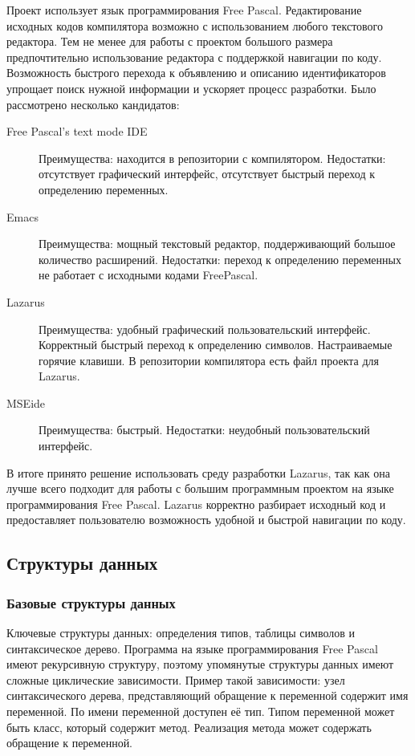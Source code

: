 \documentclass{imcs}
\begin{document}
Проект использует язык программирования Free Pascal. Редактирование исходных кодов
компилятора возможно с использованием любого текстового редактора. Тем не менее
для работы с проектом большого размера предпочтительно использование редактора с
поддержкой навигации по коду. Возможность быстрого перехода к объявлению и описанию
идентификаторов упрощает поиск нужной информации и ускоряет процесс разработки.
Было рассмотрено несколько кандидатов:
\begin{description}
  \item[Free Pascal's text mode IDE] Преимущества: находится в репозитории с 
компилятором. Недостатки: отсутствует графический интерфейс, отсутствует
быстрый переход к определению переменных.
  \item[Emacs] Преимущества: мощный текстовый редактор, поддерживающий большое
количество расширений. Недостатки: переход к определению переменных не работает
с исходными кодами FreePascal.
  \item[Lazarus] Преимущества: удобный графический пользовательский интерфейс.
Корректный быстрый переход к определению символов. Настраиваемые горячие клавиши.
В репозитории компилятора есть файл проекта для Lazarus.
  \item[MSEide] Преимущества: быстрый. Недостатки: неудобный 
пользовательский интерфейс.
\end{description} 
В итоге принято решение использовать среду разработки Lazarus, так как она
лучше всего подходит для работы с большим программным проектом на
языке программирования Free Pascal. Lazarus корректно разбирает
исходный код и предоставляет пользователю возможность удобной и
быстрой навигации по коду.

\fi

\subsection{Структуры данных}

\subsubsection{Базовые структуры данных}

Ключевые структуры данных: определения типов, таблицы символов и
синтаксическое дерево. Программа на языке программирования Free Pascal имеют рекурсивную структуру,
поэтому упомянутые структуры данных имеют сложные циклические зависимости. Пример такой 
зависимости: узел синтаксического дерева, представляющий обращение к переменной содержит имя
переменной. По имени переменной доступен её тип. Типом переменной может быть класс, который
содержит метод. Реализация метода  может содержать обращение к переменной.
\end{document}

